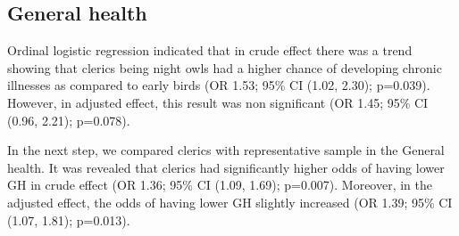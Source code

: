 \documentclass[ijerph,article,accept,moreauthors,pdftex]{mdpi}
\begin{document}
\begin{table}[!h]

\caption{\label{tab:Print regres tab 2}Depicts associations (in Odds rations) between living in clerical life and health complains in the last month}
\centering
{}
\end{table}

\hypertarget{general-health}{%
\subsection{General health}\label{general-health}}

Ordinal logistic regression indicated that in crude effect there was a
trend showing that clerics being night owls had a higher chance of
developing chronic illnesses as compared to early birds (OR 1.53; 95\%
CI (1.02, 2.30); p=0.039). However, in adjusted effect, this result was
non significant (OR 1.45; 95\% CI (0.96, 2.21); p=0.078).

In the next step, we compared clerics with representative sample in the
General health. It was revealed that clerics had significantly higher
odds of having lower GH in crude effect (OR 1.36; 95\% CI (1.09, 1.69);
p=0.007). Moreover, in the adjusted effect, the odds of having lower GH
slightly increased (OR 1.39; 95\% CI (1.07, 1.81); p=0.013).
\end{document}
